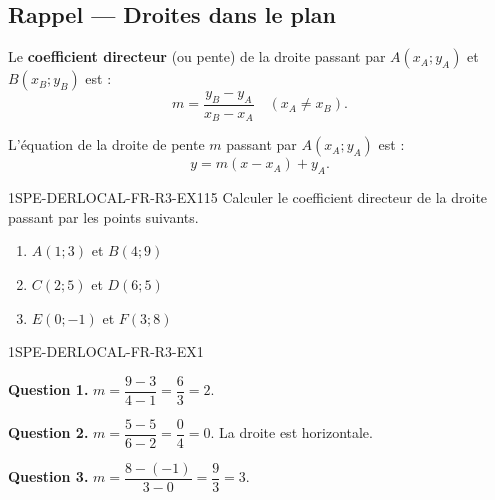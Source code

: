 

\subsection*{Rappel — Droites dans le plan}

Le \textbf{coefficient directeur} (ou pente) de la droite passant par $A(x_A;y_A)$ et $B(x_B;y_B)$ est :
\[
  m = \frac{y_B - y_A}{x_B - x_A} \quad (x_A
\neq x_B).
\]

L'équation de la droite de pente $m$ passant par $A(x_A;y_A)$ est :
\[
  y = m(x - x_A) + y_A.
\]


\begin{exercice}{1SPE-DERLOCAL-FR-R3-EX1}{1}{5}
Calculer le coefficient directeur de la droite passant par les points suivants.
\begin{enumerate}
  \item $A(1;3)$ et $B(4;9)$
  \item $C(2;5)$ et $D(6;5)$
  \item $E(0;-1)$ et $F(3;8)$
\end{enumerate}
\end{exercice}


\begin{corrige}{1SPE-DERLOCAL-FR-R3-EX1}

\textbf{Question 1.}
$m = \dfrac{9-3}{4-1} = \dfrac{6}{3} = 2.$

\textbf{Question 2.}
$m = \dfrac{5-5}{6-2} = \dfrac{0}{4} = 0.$ La droite est horizontale.

\textbf{Question 3.}
$m = \dfrac{8-(-1)}{3-0} = \dfrac{9}{3} = 3.$

\end{corrige}

